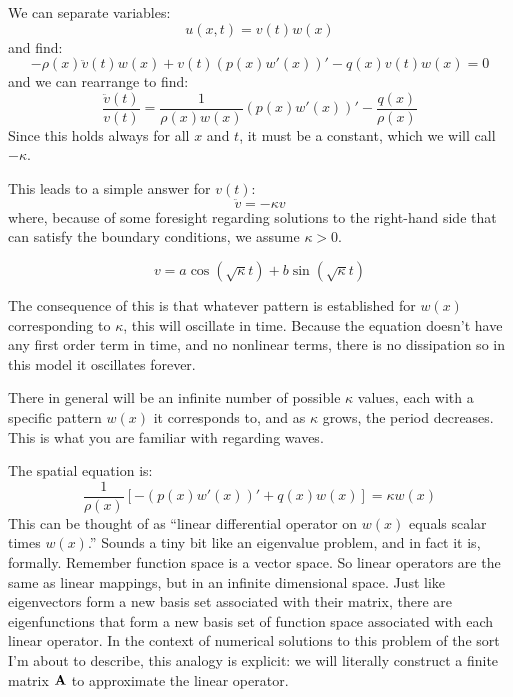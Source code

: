 We can separate variables:
\begin{equation}
u(x, t) = v(t) w(x)
\end{equation}
and find:
\begin{equation}
- \rho(x) \ddot{v}(t) w(x) + v(t) \left(p(x) w'(x)\right)' - q(x)v(t) w(x) = 0
\end{equation}
and we can rearrange to find:
\begin{equation}
\frac{\ddot{v}(t)}{v(t)} = \frac{1}{\rho(x) w(x)}\left(p(x)
w'(x)\right)' - \frac{q(x)}{\rho(x)}
\end{equation}
Since this holds always for all $x$ and $t$, it must be a constant,
which we will call $-\kappa$. 

This leads to a simple answer for $v(t)$:
\begin{equation}
\ddot{v} = - \kappa v
\end{equation}
where, because of some foresight regarding solutions to the right-hand
side that can satisfy the boundary conditions, we assume $\kappa>0$.


\begin{answer}
\begin{equation}
v = a \cos(\sqrt{\kappa} t) + b \sin(\sqrt{\kappa} t)
\end{equation}

The consequence of this is that whatever pattern is established for
$w(x)$ corresponding to $\kappa$, this will oscillate in
time. Because the equation doesn't have any first order term in time,
and no nonlinear terms, there is no dissipation so in this model it
oscillates forever.

There in general will be an infinite number of possible $\kappa$
values, each with a specific pattern $w(x)$ it corresponds to, and as
$\kappa$ grows, the period decreases. This is what you are familiar
with regarding waves.
\end{answer}

The spatial equation is:
\begin{equation}
\frac{1}{\rho(x)} \left[- \left(p(x) w'(x)\right)' + q(x) w(x)\right] =
\kappa w(x)
\end{equation}
This can be thought of as ``linear differential operator on $w(x)$
equals scalar times $w(x)$.'' Sounds a tiny bit like an eigenvalue
problem, and in fact it is, formally. Remember function space is a
vector space. So linear operators are the same as linear mappings, but
in an infinite dimensional space. Just like eigenvectors form a new
basis set associated with their matrix, there are eigenfunctions  that
form a new basis set of function space associated with each linear
operator. In the context of numerical solutions to this problem of the
sort I'm about to describe, this analogy is explicit: we will
literally construct a finite matrix ${\bf A}$ to approximate the
linear operator.

